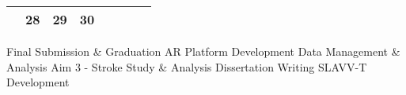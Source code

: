 {\begin{tabularx}{\linewidth}{|l!{\vrule width \myLenLineThicknessThick}*{7}{@{}X@{}|}}
      
        \\  \hline 
      
    
  
  
  
  \hyperlink{week-2026-39}{} &
    
      
      
        \begin{minipage}[t]{6mm}\centering{}28\end{minipage}
      
       & 
    
      
      
        \begin{minipage}[t]{6mm}\centering{}29\end{minipage}
      
       & 
    
      
      
        \begin{minipage}[t]{6mm}\centering{}30\end{minipage}
      
       & 
    
      
      
       & 
    
      
      
       & 
    
      
      
       & 
    
      
      
      
        \\  \hline 
      
    
  
  
  \end{tabularx}
}
\vfill{\centering{} \small{Final Submission \& Graduation}\hspace{ 1.5em } \small{AR Platform Development}\hspace{ 1.5em } \small{Data Management \& Analysis}\hspace{ 1.5em } \small{Aim 3 - Stroke Study \& Analysis}\hspace{ 1.5em } \small{Dissertation Writing}\hspace{ 1.5em } \small{SLAVV-T Development}\hspace{ 1.5em }\par}

